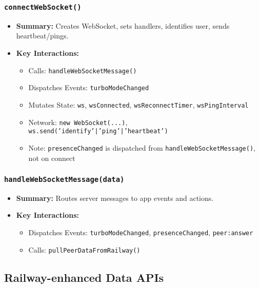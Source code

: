 \documentclass[11pt,letterpaper]{article}
\begin{document}
\subsubsection{\texttt{connectWebSocket()}}
\begin{itemize}
    \item \textbf{Summary:} Creates WebSocket, sets handlers, identifies user, sends heartbeat/pings.
    \item \textbf{Key Interactions:}
    \begin{itemize}
        \item Calls: \texttt{handleWebSocketMessage()}
        \item Dispatches Events: \texttt{turboModeChanged}
        \item Mutates State: \texttt{ws}, \texttt{wsConnected}, \texttt{wsReconnectTimer}, \texttt{wsPingInterval}
        \item Network: \texttt{new WebSocket(...)}, \texttt{ws.send('identify'|'ping'|'heartbeat')}
        \item Note: \texttt{presenceChanged} is dispatched from \texttt{handleWebSocketMessage()}, not on connect
    \end{itemize}
\end{itemize}

\subsubsection{\texttt{handleWebSocketMessage(data)}}
\begin{itemize}
    \item \textbf{Summary:} Routes server messages to app events and actions.
    \item \textbf{Key Interactions:}
    \begin{itemize}
        \item Dispatches Events: \texttt{turboModeChanged}, \texttt{presenceChanged}, \texttt{peer:answer}
        \item Calls: \texttt{pullPeerDataFromRailway()}
    \end{itemize}
\end{itemize}

\subsection{Railway-enhanced Data APIs}
\end{document}
